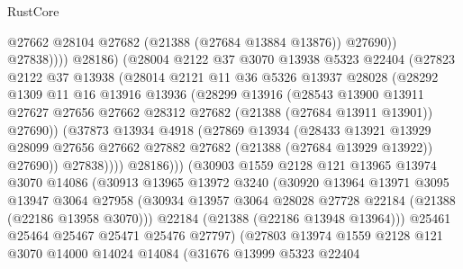 \begin{lexlean}{RustCore}
\begin{coremodule}
                          @27662
                          @28104
                          @27682
                          (@21388 (@27684 @13884 @13876))
                          @27690))
                      @27838))))
              @28186)
            (@28004
              @2122
              @37
              @3070
              @13938
              @5323
              @22404
              (@27823
                @2122
                @37
                @13938
                (@28014
                  @2121
                  @11
                  @36
                  @5326
                  @13937
                  @28028
                  (@28292
                    @1309
                    @11
                    @16
                    @13916
                    @13936
                    (@28299
                      @13916
                      (@28543
                        @13900
                        @13911
                        @27627
                        @27656
                        @27662
                        @28312
                        @27682
                        (@21388 (@27684 @13911 @13901))
                        @27690))
                    (@37873
                      @13934
                      @4918
                      (@27869
                        @13934
                        (@28433
                          @13921
                          @13929
                          @28099
                          @27656
                          @27662
                          @27882
                          @27682
                          (@21388 (@27684 @13929 @13922))
                          @27690))
                      @27838))))
              @28186)))
        (@30903
          @1559
          @2128
          @121
          @13965
          @13974
          @3070
          @14086
          (@30913
            @13965
            @13972
            @3240
            (@30920
              @13964
              @13971
              @3095
              @13947
              @3064
              @27958
              (@30934 @13957 @3064 @28028 @27728 @22184 (@21388 (@22186 @13958 @3070)))
              @22184
              (@21388 (@22186 @13948 @13964)))
            @25461
            @25464
            @25467
            @25471
            @25476
            @27797)
          (@27803
            @13974
            @1559
            @2128
            @121
            @3070
            @14000
            @14024
            @14084
            (@31676
              @13999
              @5323
              @22404

\end{coremodule}
\end{lexlean}
